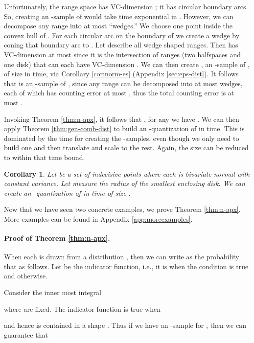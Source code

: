 \documentclass{journal}
\newtheorem {corollary}[theorem]{Corollary}
\begin{document}
Unfortunately, the range space  has VC-dimension ; it has  circular boundary arcs.  So, creating an -sample of  would take time exponential in .  However, we can decompose any range  into at most  ``wedges.''  We choose one point  inside the convex hull of .  For each circular arc on the boundary of  we create a wedge by coning that boundary arc to .  Let  describe all wedge shaped ranges.  Then  has VC-dimension  at most  since it is the intersection of  ranges (two halfspaces and one disk) that can each have VC-dimension .
We can then create , an -sample of , of size  in  time, via Corollary \ref{cor:norm-es} (Appendix \ref{sec:eps-dist}).
It follows that  is an -sample of , since any range  can be decomposed into at most  wedges, each of which has counting error at most , thus the total counting error is at most .

Invoking Theorem \ref{thm:n-apx}, it follows that , for any  we have .   We can then apply Theorem \ref{thm:gen-comb-dist} to build an -quantization of  in  time.   This is dominated by the time for creating the  -samples, even though we only need to build one and then translate and scale to the rest.  
Again, the size can be reduced to  within that time bound.  

\begin{corollary}
Let  be a set of indecisive points where each  is bivariate normal with constant variance.  Let  measure the radius of the smallest enclosing disk.
We can create an -quantization of  in  time  of size .
\label{cor:n-apx-seb2}
\end{corollary}


Now that we have seen two concrete examples, we prove Theorem \ref{thm:n-apx}. More examples can be found in Appendix \ref {app:moreexamples}.

\paragraph{Proof of Theorem \ref{thm:n-apx}.}


When each  is drawn from a distribution , then we can write  as the probability that  as follows.  Let  be the indicator function, i.e., it is  when the condition is true and  otherwise.

Consider the inner most integral

where  are fixed.  The indicator function  is true 
when

and hence  is contained in a shape .
Thus if we have an -sample  for , then we can guarantee that
\end{document}
